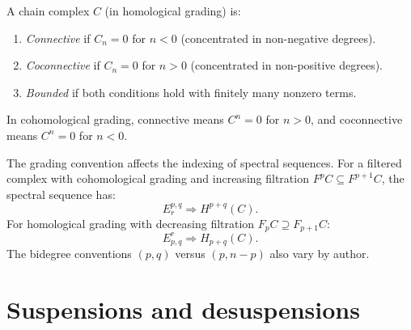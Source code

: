 \begin{definition}
\label{def:connective}
A chain complex $C$ (in homological grading) is:
\begin{enumerate}[label=(\roman*)]
\item \emph{Connective} if $C_n = 0$ for $n < 0$ (concentrated in non-negative degrees).
\item \emph{Coconnective} if $C_n = 0$ for $n > 0$ (concentrated in non-positive degrees).
\item \emph{Bounded} if both conditions hold with finitely many nonzero terms.
\end{enumerate}
In cohomological grading, connective means $C^n = 0$ for $n > 0$, and 
coconnective means $C^n = 0$ for $n < 0$.
\end{definition}

\begin{remark}
\label{rem:filt-ss-grading}
The grading convention affects the indexing of spectral sequences. For a 
filtered complex with cohomological grading and increasing filtration 
$F^p C \subseteq F^{p+1} C$, the spectral sequence has:
\[
E_r^{p,q} \Rightarrow H^{p+q}(C).
\]
For homological grading with decreasing filtration $F_p C \supseteq F_{p+1} C$:
\[
E^r_{p,q} \Rightarrow H_{p+q}(C).
\]
The bidegree conventions $(p, q)$ versus $(p, n-p)$ also vary by author.
\end{remark}


\section{Suspensions and desuspensions}
\label{sec:susp-desusp}


